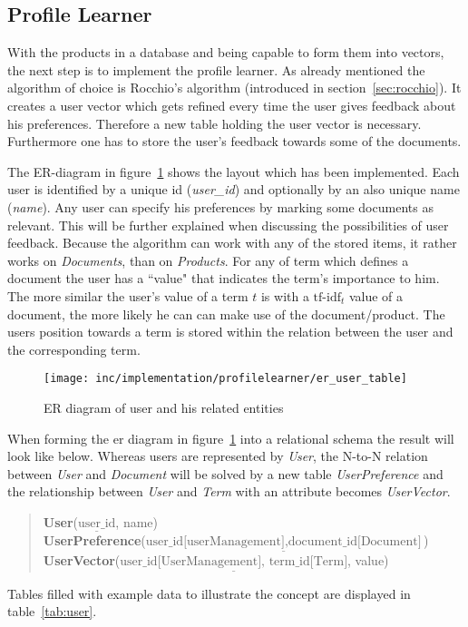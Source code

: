 
\subsection{Profile Learner}
\label{sec:rocchio-impl}
With the products in a database and being capable to form them into vectors, the next step is to implement the profile learner.
As already mentioned the algorithm of choice is Rocchio's algorithm (introduced in section~\ref{sec:rocchio}).
It creates a user vector which gets refined every time the user gives feedback about his preferences.
Therefore a new table holding the user vector is necessary.
Furthermore one has to store the user's feedback towards some of the documents.

The ER-diagram in figure~\ref{fig:er_user_table} shows the layout which has been implemented.
Each user is identified by a unique id (\textit{user\_id}) and optionally by an also unique name (\textit{name}).
Any user can specify his preferences by marking some documents as relevant.
This will be further explained when discussing the possibilities of user feedback.
Because the algorithm can work with any of the stored items, it rather works on \textit{Documents}, than on \textit{Products}.
For any of term which defines a document the user has a ``value" that indicates the term's importance to him.
The more similar the user's value of a term $t$ is with a $\text{tf-idf}_t$ value of a document, the more likely he can can make use of the document/product.
The users position towards a term is stored within the relation between the user and the corresponding term.

\begin{figure}[h]
    \center
    \texttt{[image: inc/implementation/profilelearner/er\_user\_table]}
    \caption{ER diagram of user and his related entities}
    \label{fig:er_user_table}
\end{figure}

When forming the er diagram in figure~\ref{fig:er_user_table} into a relational schema the result will look like below.
Whereas users are represented by \textit{User}, the N-to-N relation between \textit{User} and \textit{Document} will be solved by a new table \textit{UserPreference} and the relationship between \textit{User} and \textit{Term} with an attribute becomes \textit{UserVector}.
\begin{quote}
    \textbf{User}($\underline{\text{user\_id}}$, name)\\
    \textbf{UserPreference}($\underline{\text{user\_id[userManagement]},\text{document\_id[Document]}}$)\\
    \textbf{UserVector}($\underline{\text{user\_id[UserManagement], term\_id[Term]}}$, value)\\
\end{quote}
Tables filled with example data to illustrate the concept are displayed in table~\ref{tab:user}.

